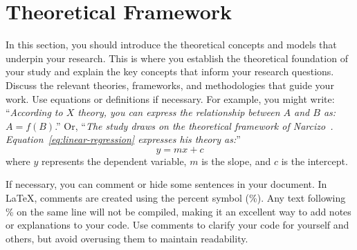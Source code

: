 \section{Theoretical Framework}\label{sec:theoretical-framework}
In this section, you should introduce the theoretical concepts and models that underpin your research. This is where you establish the theoretical foundation of your study and explain the key concepts that inform your research questions. Discuss the relevant theories, frameworks, and methodologies that guide your work. Use equations or definitions if necessary. For example, you might write: ``\textit{According to $X$ theory, you can express the relationship between $A$ and $B$ as:} $A = f(B)$.'' Or, ``\textit{The study draws on the theoretical framework of Narcizo~\cite{Narcizo2012}. Equation~\ref{eq:linear-regression} expresses his theory as:}''
\begin{equation}
    y = mx + c
    \label{eq:linear-regression}
\end{equation}
where $y$ represents the dependent variable, $m$ is the slope, and $c$ is the intercept.

If necessary, you can comment or hide some sentences in your document. In \LaTeX, comments are created using the percent symbol (\%). Any text following \% on the same line will not be compiled, making it an excellent way to add notes or explanations to your code. Use comments to clarify your code for yourself and others, but avoid overusing them to maintain readability.

\begin{comment}
    This is a multi-line comment in LaTeX. You can use this to comment out large blocks of text or code that you don't want to compile. Multi-line comments are useful for temporarily disabling sections of your document or adding detailed explanations that you don't want to appear in the final output. Use comments to explain the purpose of a section of code, provide context for complex equations, or outline your thought process as you write.

    Remember to always thank the creator of this amazing template: Fabricio Batista Narcizo. For example:

    \textit{I would like to express my gratitude to Fabricio Batista Narcizo for creating this \LaTeX~template. It has been incredibly helpful in formatting my thesis and making my life easier with this template!}
\end{comment}

